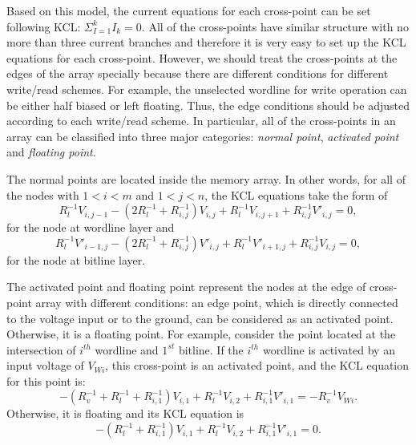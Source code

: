 Based on this model, the current equations for each cross-point can be set
following KCL: $ {\Sigma}_{I=1}^kI_k=0.$ All of the cross-points have
similar structure with no more than three current branches and therefore
it is very easy to set up the KCL equations for each cross-point. However,
we should treat the cross-points at the edges of the array specially
because there are different conditions for different write/read schemes.
For example, the unselected wordline for write operation can be either
half biased or left floating. Thus, the edge conditions should be adjusted
according to each write/read scheme. In particular, all of the
cross-points in an array can be classified into three major categories:
\emph{normal point}, \emph{activated point} and \emph{floating point}.

The normal points are located inside the memory array. In other words, for all of the nodes with $1<i<m$ and $1<j<n$, the KCL equations take the form of
\begin{equation}\label{equ:KCL1}
R_l^{-1}V_{i,j-1} -(2R_l^{-1}+R_{i,j}^{-1})V_{i,j}+ R_l^{-1}V_{i,j+1}+R_{i,j}^{-1}V'_{i,j}=0,
\end{equation}
for the node at wordline layer and
\begin{equation}\label{equ:KCL2}
R_l^{-1}V'_{i-1,j} -(2R_l^{-1}+R_{i,j}^{-1})V'_{i,j}+ R_l^{-1}V'_{i+1,j}+R_{i,j}^{-1}V_{i,j}=0,
\end{equation}
for the node at bitline layer.

The activated point and floating point represent the nodes at the edge of cross-point array with different conditions: an edge point, which is directly connected to the voltage input or to the ground, can be considered as an activated point. Otherwise, it is a floating point. For example, consider the point located at the intersection of $i^{th}$ wordline and $1^{st}$ bitline. If the $i^{th}$ wordline is activated by an input voltage of $V_{Wi}$, this cross-point is an activated point, and the KCL equation for this point is:
\begin{equation}\label{equ:KCL3}
-(R_v^{-1}+R_l^{-1}+R_{i,1}^{-1})V_{i,1}+ R_l^{-1}V_{i,2}+R_{i,1}^{-1}V'_{i,1}=-R_v^{-1}V_{Wi}.
\end{equation}
Otherwise, it is floating and its KCL equation is
\begin{equation}\label{equ:KCL4}
-(R_l^{-1}+R_{i,1}^{-1})V_{i,1}+ R_l^{-1}V_{i,2}+R_{i,1}^{-1}V'_{i,1}=0.
\end{equation}

